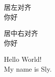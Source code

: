 \documentclass{article}
\begin{document}
 
	\begin{flushleft}
		居左对齐\\
		你好
	\end{flushleft}

	\begin{flushright}
		居中右对齐\\
		你好
	\end{flushright}
	Hello World!\\
	My name is Sly.
\end{document}
